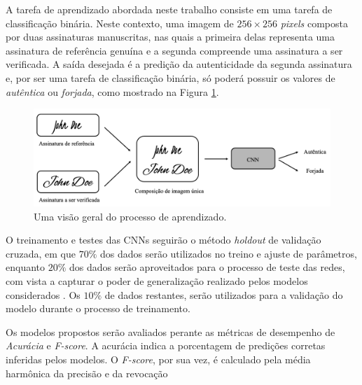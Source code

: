 

A tarefa de aprendizado abordada neste trabalho consiste em uma tarefa de classificação binária. Neste contexto, uma imagem de $256 \times 256$ \emph{pixels} composta por duas assinaturas manuscritas, nas quais a primeira delas representa uma assinatura de referência genuína e a segunda compreende uma assinatura a ser verificada. A saída desejada é a predição da autenticidade da segunda assinatura e, por ser uma tarefa de classificação binária, só poderá possuir os valores de \emph{autêntica} ou \emph{forjada}, como mostrado na Figura \ref{fig:esquema-solucao}.

\begin{figure}[h!]
  \centering
  \caption{Uma visão geral do processo de aprendizado.}
  \label{fig:esquema-solucao}
  \includegraphics[width=\textwidth]{imgs/esquema-solucao}
\end{figure}

O treinamento e testes das CNNs seguirão o método \emph{holdout} de validação cruzada, em que $70\%$ dos dados serão utilizados no treino e ajuste de parâmetros, enquanto $20\%$ dos dados serão aproveitados para o processo de teste das redes, com vista a capturar o poder de generalização realizado pelos modelos considerados \cite{brink}. Os $10\%$ de dados restantes, serão utilizados para a validação do modelo durante o processo de treinamento.

Os modelos propostos serão avaliados perante as métricas de desempenho de \emph{Acurácia} e \emph{F-score}. A acurácia indica a porcentagem de predições corretas inferidas pelos modelos. O \emph{F-score}, por sua vez, é calculado pela média harmônica da precisão e da revocação
